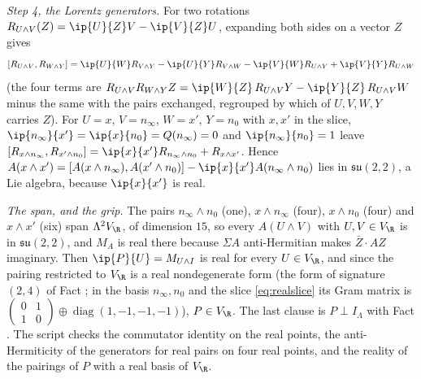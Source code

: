 \emph{Step 4, the Lorentz generators.} For two rotations $R_{U\wedge V}(Z) = \ip{U}{Z}V - \ip{V}{Z}U$, expanding both sides on a vector $Z$ gives
\[
[R_{U\wedge V}, R_{W\wedge Y}] = \ip{U}{W}R_{V\wedge Y} - \ip{U}{Y}R_{V\wedge W} - \ip{V}{W}R_{U\wedge Y} + \ip{V}{Y}R_{U\wedge W}
\]
(the four terms are $R_{U\wedge V}R_{W\wedge Y}Z = \ip{W}{Z}\,R_{U\wedge V}Y - \ip{Y}{Z}\,R_{U\wedge V}W$ minus the same with the pairs exchanged, regrouped by which of $U, V, W, Y$ carries $Z$). For $U = x$, $V = n_{\infty}$, $W = x'$, $Y = n_{0}$ with $x, x'$ in the slice, $\ip{n_{\infty}}{x'} = \ip{x}{n_{0}} = Q(n_{\infty}) = 0$ and $\ip{n_{\infty}}{n_{0}} = 1$ leave $[R_{x\wedge n_{\infty}}, R_{x'\wedge n_{0}}] = \ip{x}{x'}R_{n_{\infty}\wedge n_{0}} + R_{x\wedge x'}$. Hence $A(x\wedge x') = [A(x\wedge n_{\infty}), A(x'\wedge n_{0})] - \ip{x}{x'}A(n_{\infty}\wedge n_{0})$ lies in $\mathfrak{su}(2,2)$, a Lie algebra, because $\ip{x}{x'}$ is real.

\emph{The span, and the grip.} The pairs $n_{\infty}\wedge n_{0}$ (one), $x\wedge n_{\infty}$ (four), $x\wedge n_{0}$ (four) and $x\wedge x'$ (six) span $\Lambda^{2}V_{\R}$, of dimension $15$, so every $A(U\wedge V)$ with $U, V \in V_{\R}$ is in $\mathfrak{su}(2,2)$, and $M_{A}$ is real there because $\Sigma A$ anti-Hermitian makes $\bar{Z}\cdot AZ$ imaginary. Then $\ip{P}{U} = M_{U\wedge I}$ is real for every $U \in V_{\R}$, and since the pairing restricted to $V_{\R}$ is a real nondegenerate form (the form of signature $(2,4)$ of Fact ; in the basis $n_{\infty}, n_{0}$ and the slice \eqref{eq:realslice} its Gram matrix is $\left(\begin{smallmatrix} 0 & 1 \\ 1 & 0\end{smallmatrix}\right) \oplus \operatorname{diag}(1,-1,-1,-1)$), $P \in V_{\R}$. The last clause is $P \perp I_{\Lambda}$ with Fact . The script checks the commutator identity on the real points, the anti-Hermiticity of the generators for real pairs on four real points, and the reality of the pairings of $P$ with a real basis of $V_{\R}$.
